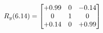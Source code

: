 \documentclass[preview]{standalone}
\begin{document}
\begin{align*}
\special{dvisvgm:raw <g id='unique000'>}R_{y}(6.14) = \begin{bmatrix}+0.99 & 0 & -0.14 \\0 & 1 & 0 \\+0.14 & 0 & +0.99\end{bmatrix}\special{dvisvgm:raw </g>}
\end{align*}
\end{document}
